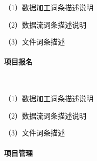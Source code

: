 （1）数据加工词条描述说明



（2）数据流词条描述说明



（3）文件词条描述



\paragraph{项目报名}~{}
\\

\begin{figure}[H]
    \end{figure}

（1）数据加工词条描述说明



（2）数据流词条描述说明



（3）文件词条描述




\paragraph{项目管理}~{}
\\

